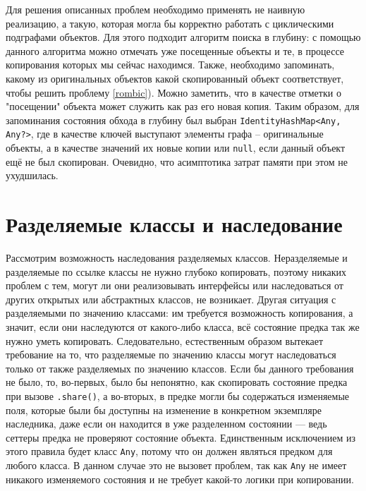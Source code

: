 \documentclass[specification,annotation,times]{itmo-student-thesis}
\newcommand{\todo}[1]{\textbf{TODO}} %
\begin{document}
Для решения описанных проблем необходимо применять не наивную реализацию,
а такую, которая могла бы корректно работать с циклическими подграфами объектов.
Для этого подходит алгоритм поиска в глубину: с помощью данного алгоритма можно отмечать уже посещенные объекты и те, в процессе копирования которых мы сейчас находимся.
Также, необходимо запоминать, какому из оригинальных объектов какой скопированный объект соответствует, чтобы решить проблему \ref{rombic}). 
Можно заметить, что в качестве отметки о "посещении" объекта может служить как раз его новая копия.
Таким образом, для запоминания состояния обхода в глубину был выбран \texttt{IdentityHashMap<Any, Any?>}, где в качестве ключей выступают элементы графа -- оригинальные объекты, а в качестве значений их новые копии или \texttt{null}, если данный объект ещё не был скопирован.
Очевидно, что асимптотика затрат памяти при этом не ухудшилась.
%



\section{Разделяемые классы и наследование}\label{inheritance}

Рассмотрим возможность наследования разделяемых классов.
Неразделяемые и разделяемые по ссылке классы не нужно глубоко копировать, поэтому никаких проблем с тем, могут ли они реализовывать интерфейсы или наследоваться от других открытых или абстрактных классов, не возникает.
Другая ситуация с разделяемыми по значению классами: им требуется возможность копирования, а значит, если они наследуются от какого-либо класса, всё состояние предка так же нужно уметь копировать.
Следовательно, естественным образом вытекает требование на то, что разделяемые по значению классы могут наследоваться только от также разделяемых по значению классов.
Если бы данного требования не было, то, во-первых, было бы непонятно, как скопировать состояние предка при вызове \texttt{.share()}, а во-вторых, в предке могли бы содержаться изменяемые поля, которые были бы доступны на изменение в конкретном экземпляре наследника, даже если он находится в уже разделенном состоянии --- ведь сеттеры предка не проверяют состояние объекта.
Единственным исключением из этого правила будет класс \texttt{Any}, потому что он должен являться предком для любого класса. В данном случае это не вызовет проблем, так как \texttt{Any} не имеет никакого изменяемого состояния и не требует какой-то логики при копировании.
\end{document}
